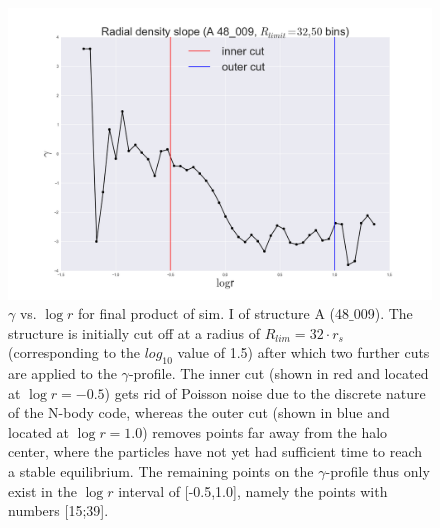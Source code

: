 \begin{figure}[!htbp]
\centering
\includegraphics[width=1.0\linewidth]{img/A_48_009_gamma_logr_I_R32_cuts.png}
\caption{$\gamma$ vs. $\log r$ for final product of sim. I of structure A (48$\_$009).
The structure is initially cut off at a radius of $R_{lim} = 32\cdot r_s$ (corresponding to the $log_{10}$ value of 1.5) 
after which two further cuts are applied to the $\gamma$-profile.
The inner cut (shown in red and located at $\log r = -0.5$) gets rid of Poisson noise due to the discrete nature of the N-body code, 
whereas the outer cut (shown in blue and located at $\log r = 1.0$) removes points far away from the halo center, where the particles have not yet had sufficient time to reach a stable equilibrium.
The remaining points on the $\gamma$-profile thus only exist in the $\log r $ interval of [-0.5,1.0], namely the points with numbers [15;39].}
\label{fig:test}
\end{figure}

